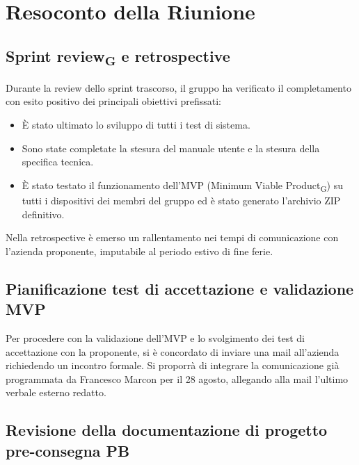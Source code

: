 
\section{Resoconto della Riunione}


\subsection{Sprint review\textsubscript{G} e retrospective}

Durante la review dello sprint trascorso, il gruppo ha verificato il completamento con esito positivo dei principali obiettivi prefissati:
\begin{itemize}

\item È stato ultimato lo sviluppo di tutti i test di sistema.

\item Sono state completate la stesura del manuale utente e la stesura della specifica tecnica.

\item È stato testato il funzionamento dell'MVP (Minimum Viable Product\textsubscript{G}) su tutti i dispositivi dei membri del gruppo ed è stato generato l'archivio ZIP definitivo.

\end{itemize}

Nella retrospective è emerso un rallentamento nei tempi di comunicazione con l'azienda proponente, imputabile al periodo estivo di fine ferie.


\subsection{Pianificazione test di accettazione e validazione MVP}

Per procedere con la validazione dell'MVP e lo svolgimento dei test di accettazione con la proponente, si è concordato di inviare una mail all'azienda richiedendo un incontro formale. Si proporrà di integrare la comunicazione già programmata da Francesco Marcon per il 28 agosto, allegando alla mail l'ultimo verbale esterno redatto.


\subsection{Revisione della documentazione di progetto pre-consegna PB}

